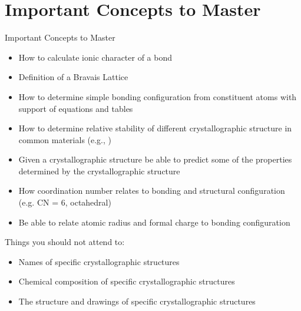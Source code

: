 \documentclass{libs/XJTLU_format}
\begin{document}
\section{Important Concepts to Master}
\begin{frame}{Important Concepts to Master}
\begin{itemize}
    \item How to calculate ionic character of a bond
    \pause
    \item Definition of a Bravais Lattice
    \pause
    \item How to determine simple bonding configuration from constituent atoms with support of equations and tables
    \pause
    \item How to determine relative stability of different crystallographic structure in common materials (e.g., )
    \pause
    \item Given a crystallographic structure be able to predict some of the properties determined by the crystallographic structure
    \pause
    \item How coordination number relates to bonding and structural configuration (e.g. CN = 6, octahedral)
    \pause
    \item Be able to relate atomic radius and formal charge to bonding configuration
    \pause
\end{itemize}

Things you should not attend to:
\begin{itemize}
    \item Names of specific crystallographic structures
    \item Chemical composition of specific crystallographic structures
    \item The structure and drawings of specific crystallographic structures
\end{itemize}
    
\end{frame}
 
    





    



    
\end{document}
